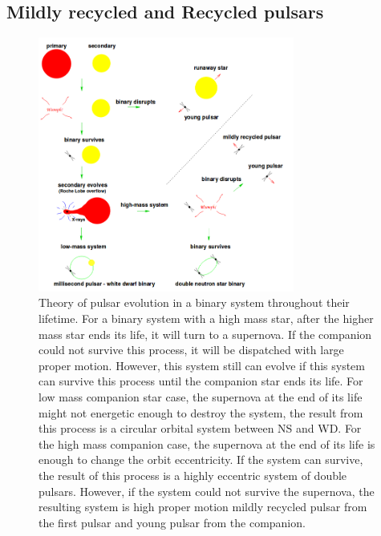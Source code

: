 \documentclass[thesis_msc.tex]{subfiles}
\begin{document}
\subsection{Mildly recycled and Recycled pulsars}

\begin{figure}[h] \centering \includegraphics[width=0.75\textwidth]{figures/evo.png}
\caption{Theory of pulsar evolution in a binary system throughout their lifetime. For a binary system with a high mass star, after the higher mass star ends its life, it will turn to a supernova. If the companion could not survive this process, it will be dispatched with large proper motion. However, this system still can evolve if this system can survive this process until the companion star ends its life. For low mass companion star case, the supernova at the end of its life might not energetic enough to destroy the system, the result from this process is a circular orbital system between NS and WD. For the high mass companion case, the supernova at the end of its life is enough to change the orbit eccentricity. If the system can survive, the result of this process is a highly eccentric system of double pulsars. However, if the system could not survive the supernova, the resulting system is high proper motion mildly recycled pulsar from the first pulsar and young pulsar from the companion.   }

\label{evo}
\end{figure}
\end{document}
